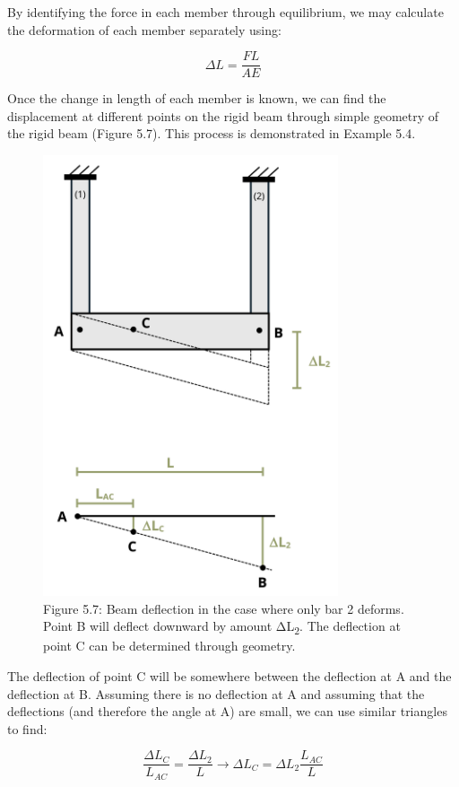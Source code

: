 \documentclass[
  letterpaper,
  DIV=11,
  numbers=noendperiod]{scrreprt}
\theoremstyle{definition}
\theoremstyle{remark}
\begin{document}
By identifying the force in each member through equilibrium, we may
calculate the deformation of each member separately using:

\[
\Delta L=\frac{F L}{A E}\]

Once the change in length of each member is known, we can find the
displacement at different points on the rigid beam through simple
geometry of the rigid beam (Figure 5.7). This process is demonstrated in
Example 5.4.

\begin{figure}[H]

{\centering \includegraphics[width=3.42708in,height=\textheight]{images/PNGs/Figure 5.8.png}

}

\caption{Figure 5.7: Beam deflection in the case where only bar 2
deforms. Point B will deflect downward by amount ΔL\textsubscript{2}.
The deflection at point C can be determined through geometry.}

\end{figure}%

The deflection of point C will be somewhere between the deflection at A
and the deflection at B. Assuming there is no deflection at A and
assuming that the deflections (and therefore the angle at A) are small,
we can use similar triangles to find:

\[
\frac{\Delta L_C}{L_{A C}}=\frac{\Delta L_2}{L} \rightarrow \Delta L_C=\Delta L_2 \frac{L_{A C}}{L}\]
\end{document}
